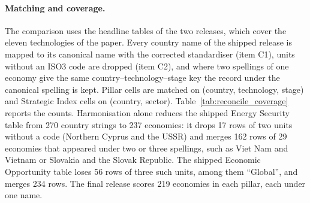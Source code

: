 
\paragraph{Matching and coverage.} The comparison uses the headline tables of the two releases,
which cover the eleven technologies of the paper. Every country name of the shipped release is
mapped to its canonical name with the corrected standardiser (item C1), units without an ISO3
code are dropped (item C2), and where two spellings of one economy give the same
country--technology--stage key the record under the canonical spelling is kept. Pillar cells are
matched on (country, technology, stage) and Strategic Index cells on (country, sector).
Table~\ref{tab:reconcile_coverage} reports the counts. Harmonisation alone reduces the shipped
Energy Security table from 270 country strings to 237 economies: it drops 17 rows of two units
without a code (Northern Cyprus and the USSR) and merges 162 rows of 29 economies that appeared
under two or three spellings, such as Viet Nam and Vietnam or Slovakia and the Slovak Republic.
The shipped Economic Opportunity table loses 56 rows of three such units, among them ``Global'',
and merges 234 rows. The final release scores 219 economies in each pillar, each under one name.

